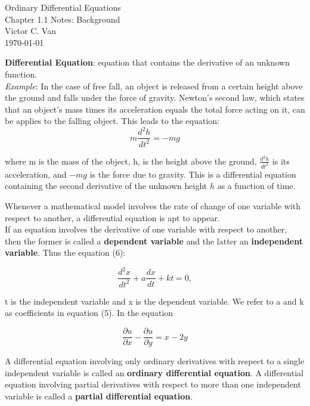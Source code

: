 \documentclass[11pt]{article}
\begin{document}
\begin{titlepage}
    \centering
    \vspace*{\fill} %
    {\Large Ordinary Differential Equations} \\[0.5cm]
    {\Large Chapter 1.1 Notes: Background} \\[0.5cm]
    {\large Victor C. Van} \\[1cm]
    {\today}
    \vspace*{\fill} %
\end{titlepage}

\textbf{Differential Equation}: equation that contains the derivative of an unknown function.\\

\textit{Example}: In the case of free fall, an object is released from a certain height above the ground and falls under the force of gravity. Newton's second law, which states that an object's mass times its acceleration equals the total force acting on it, can be applies to the falling object. This leads to the equation:\\
\[
m\frac{d^{2}h}{dt^{2}} =-mg
\]

where m is the mass of the object, h, is the height above the ground, $\frac{d^{2}h}{dt^{2}}$ is its acceleration, and $-mg$ is the force due to gravity. This is a differential equation containing the second derivative of the unknown height $h$ as a function of time.

Whenever a mathematical model involves the rate of change of one variable with respect to another, a differential equation is apt to appear.\\

If an equation involves the derivative of one variable with respect to another, then the former is called a \textbf{dependent variable} and the latter an \textbf{independent variable}. Thus the equation (6):

\[
\frac{d^{2}x}{dt^{2}} + a \frac{dx}{dt} + kt = 0, \tag{5}
\]

t is the independent variable and x is the dependent variable. We refer to a and k as coefficients in equation (5). In the equation

\[
\frac{\partial u}{\partial x} - \frac{\partial u}{\partial y} = x -2y \tag{6}
\]

A differential equation involving only ordinary derivatives with respect to a single independent variable is called an \textbf{ordinary differential equation}. A differential equation involving partial derivatives with respect to more than one independent variable is called a \textbf{partial differential equation}.\\
\end{document}
